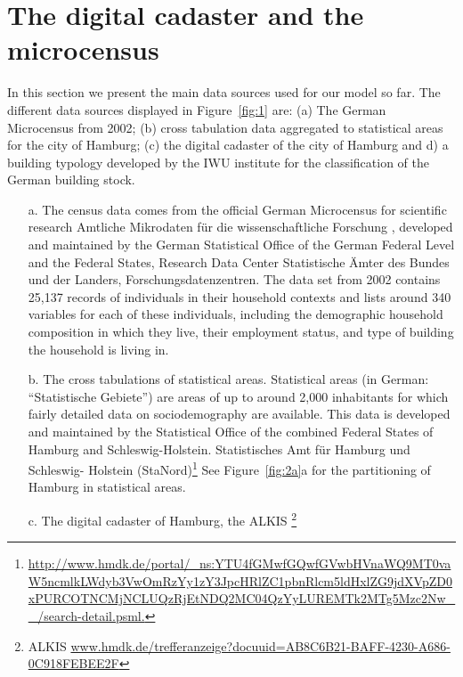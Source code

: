 \documentclass[11pt]{IJM-article}
\begin{document}
\section{The digital cadaster and the microcensus}
\label{sec:3}

In this section we present the main data sources used for our model so far. The
different data sources displayed in Figure~\ref{fig:1} are: (a) The German
Microcensus from 2002; (b) cross tabulation data aggregated to statistical
areas for the city of Hamburg; (c) the digital cadaster of the city of Hamburg
and d) a building typology developed by the IWU institute for the
classification of the German building stock.\\

\begin{enumerate}\itemsep4ex
    \item[a.] The census data comes from the official German Microcensus for
        scientific research Amtliche Mikrodaten für die wissenschaftliche
        Forschung , developed and maintained by the German
        Statistical Office of the German Federal Level and the Federal States,
        Research Data Center Statistische Ämter des Bundes und der Landers,
        Forschungsdatenzentren.  The data set from 2002 contains 25,137 records
        of individuals in their household contexts and lists around 340
        variables for each of these individuals, including the demographic
        household composition in which they live, their employment status, and
        type of building the household is living in.
    \item[b.] The cross tabulations of statistical areas. Statistical areas (in
        German: ``Statistische Gebiete'') are areas of up to around 2,000
        inhabitants for which fairly detailed data on sociodemography are
        available. This data is developed and maintained by the Statistical
        Office of the combined Federal States of Hamburg and
        Schleswig-Holstein. Statistisches Amt für Hamburg und Schleswig-
        Holstein (StaNord)\footnote{\url{http://www.hmdk.de/portal/_ns:YTU4fGMwfGQwfGVwbHVnaWQ9MT0vaW5ncmlkLWdyb3VwOmRzYy1zY3JpcHRlZC1pbnRlcm5ldHxlZG9jdXVpZD0xPURCOTNCMjNCLUQzRjEtNDQ2MC04QzYyLUREMTk2MTg5Mzc2Nw__/search-detail.psml.}} 
        See Figure~\ref{fig:2a}a for the partitioning of Hamburg in statistical
        areas.
    \item[c.] The digital cadaster of Hamburg, the ALKIS
        \footnote{ALKIS \cite{ALKIS}
        \url{www.hmdk.de/trefferanzeige?docuuid=AB8C6B21-BAFF-4230-A686-0C918FEBEE2F}}

\end{enumerate}
\end{document}
